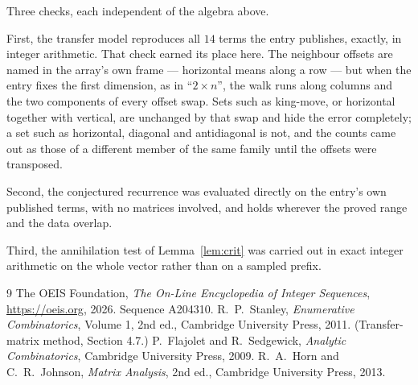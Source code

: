 \documentclass[11pt,a4paper]{article}
\theoremstyle{plain}
\theoremstyle{definition}
\begin{document}
Three checks, each independent of the algebra above.

First, the transfer model reproduces all $14$ terms the entry publishes, exactly, in
integer arithmetic. That check earned its place here. The neighbour offsets are named in the
array's own frame --- horizontal means along a row --- but when the entry fixes the first
dimension, as in ``$2\times n$'', the walk runs along columns and the two components of every
offset swap. Sets such as king-move, or horizontal together with vertical, are unchanged by
that swap and hide the error completely; a set such as horizontal, diagonal and antidiagonal
is not, and the counts came out as those of a different member of the same family until the
offsets were transposed.

Second, the conjectured recurrence was evaluated directly on the entry's own published terms,
with no matrices involved, and holds wherever the proved range and the data overlap.

Third, the annihilation test of Lemma~\ref{lem:crit} was carried out in exact integer
arithmetic on the whole vector rather than on a sampled prefix.

\begin{thebibliography}{9}
 The OEIS Foundation, \emph{The On-Line Encyclopedia of Integer
Sequences}, \url{https://oeis.org}, 2026. Sequence A204310.
 R.~P.~Stanley, \emph{Enumerative Combinatorics}, Volume 1, 2nd ed.,
Cambridge University Press, 2011. (Transfer-matrix method, Section 4.7.)
 P.~Flajolet and R.~Sedgewick, \emph{Analytic Combinatorics}, Cambridge
University Press, 2009.
 R.~A.~Horn and C.~R.~Johnson, \emph{Matrix Analysis}, 2nd ed., Cambridge
University Press, 2013.
\end{thebibliography}
\end{document}
